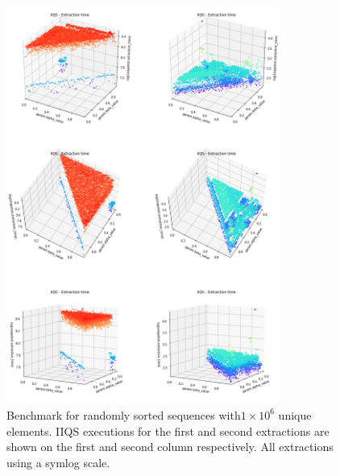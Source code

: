 \begin{figure}[!ht]
    \centering
    \includegraphics[width=0.8\textwidth]{./fragments/04_experimental_execution/images/04_alphabeta_singleclass.png}
    \caption{Benchmark for randomly sorted sequences with$1\times10^6$ unique elements. IIQS executions for the first and second extractions are shown on the first and second column respectively. All extractions using a symlog scale.}
    \label{FIG:05_ALPHABETA_RELATIONSHIP_RANDOM}
\end{figure}

